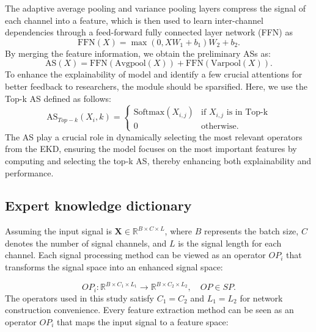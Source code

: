 \documentclass[lettersize,journal]{IEEEtran}
\begin{document}
The adaptive average pooling and variance pooling layers compress the signal of each channel into a feature, which is then used to learn inter-channel dependencies through a feed-forward fully connected layer network (FFN) as  
\begin{equation}
    \mathrm{FFN}(X)=\max(0,XW_1+b_1)W_2+b_2.
\end{equation}
By merging the feature information, we obtain the preliminary ASs as:
\begin{equation}
    \text{AS}(X) =\mathrm{FFN}(\text{Avgpool}(X)) + \mathrm{FFN}(\text{Varpool}(X)) .
\end{equation}
To enhance the explainability of model and identify a few crucial attentions for better feedback to researchers, the module should be sparsified. Here, we use the Top-k AS defined as follows: 
\begin{equation}\label{eq.as}
    \text{AS}_{Top-k}(X_i, k) = \left\{ \begin{array}{ll}
\text{Softmax}(X_{i,j}) & \text{if } X_{i,j} \text{ is in Top-k}   \\ %
0 & \text{otherwise} .
\end{array} \right.
\end{equation}
The AS play a crucial role in dynamically selecting the most relevant operators from the EKD, ensuring the model focuses on the most important features by computing and selecting the top-k AS, thereby enhancing both explainability and performance.

\subsection{Expert knowledge dictionary}

Assuming the input signal is $\mathbf{X} \in \mathbb{R}^{B \times C \times L}$, where $B$ represents the batch size, $C$ denotes the number of signal channels, and $L$ is the signal length for each channel. Each signal processing method can be viewed as an operator $OP_i$ that transforms the signal space into an enhanced signal space:

\begin{equation}
    OP_i: \mathbb{R}^{B \times C_1 \times L_1} \to \mathbb{R}^{B \times C_2 \times L_2}, \quad OP \in SP.
\end{equation}
The operators used in this study satisfy $C_1 = C_2$ and $L_1 = L_2$ for network construction convenience. Every feature extraction method can be seen as an operator $OP_i$ that maps the input signal to a feature space:
\end{document}
